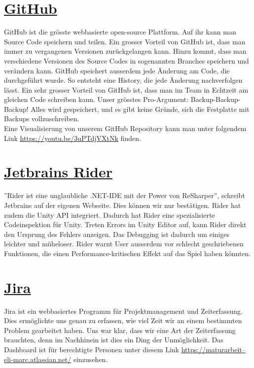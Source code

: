 \section{\href{https://github.com/}{GitHub}}
GitHub ist die grösste webbasierte open-source Plattform. Auf ihr kann man Source Code speichern und teilen. Ein grosser Vorteil von GitHub ist, dass man immer zu vergangenen Versionen zurückgelangen kann.
Hinzu kommt, dass man verschiedene Versionen des Source Codes in sogenannten Branches speichern und verändern kann. GitHub speichert ausserdem jede Änderung am Code, die durchgeführt wurde. So entsteht eine History, die jede Änderung nachverfolgen lässt. 
Ein sehr grosser Vorteil von GitHub ist, dass man im Team in Echtzeit am gleichen Code schreiben kann. Unser grösstes Pro-Argument: Backup-Backup-Backup!
Alles wird gespeichert, und es gibt keine Gründe, sich die Festplatte mit Backups vollzuschreiben. \\
Eine Visualisierung von unserem \gls{GitHub Repository} kann man unter folgendem Link \href{https://youtu.be/3uPTdjVXtNk}{https://youtu.be/3uPTdjVXtNk} finden.


\section{\href{https://www.jetbrains.com/rider/}{Jetbrains Rider}}
''Rider ist eine unglaubliche .NET-IDE mit der Power von ReSharper'', schreibt Jetbrains auf der eigenen Webseite. Dies können wir nur bestätigen. Rider hat zudem die Unity API integriert. Dadurch hat Rider eine
spezialisierte Codeinspektion für Unity. Treten Errors im Unity Editor auf, kann Rider direkt den Ursprung des Fehlers anzeigen. Das Debugging ist dadurch um einiges leichter und müheloser. 
Rider warnt User ausserdem vor schlecht geschriebenen Funktionen, die einen Performance-kritischen Effekt auf das Spiel haben könnten. 


\section{\href{https://www.atlassian.com/software/jira}{Jira}}
Jira ist ein webbasiertes Programm für Projektmanagement und Zeiterfassung. Dies ermöglichte uns genau zu erfassen, wie viel Zeit wir an einem bestimmten Problem gearbeitet haben. Uns war klar, dass wir eine Art 
der Zeiterfassung brauchten, denn im Nachhinein ist dies ein Ding der Unmöglichkeit. Das Dashboard ist für berechtigte Personen unter diesem Link \href{https://maturarbeit--eli-marc.atlassian.net/}{https://maturarbeit--eli-marc.atlassian.net/} einzusehen.

